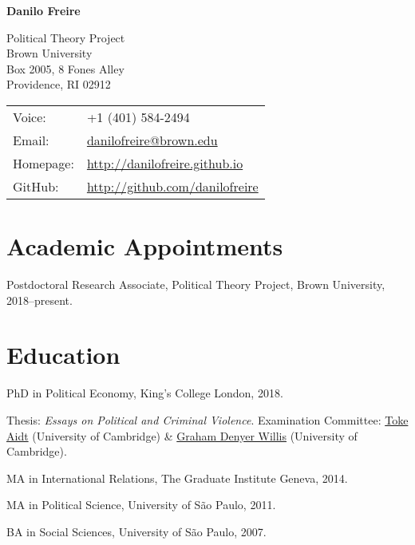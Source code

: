 \documentclass[a4paper]{article}
\def\name{Danilo Freire}
\renewenvironment{itemize}{
	\begin{list}{}{
			\setlength{\leftmargin}{1.5em}
		}
		}{
	\end{list}
}
\begin{document}
{\huge \bf \name}


\vspace{0.25in}

\begin{minipage}{0.45\linewidth}
	Political Theory Project \\
	Brown University \\
	Box 2005, 8 Fones Alley \\
	Providence, RI 02912 
\end{minipage}
\begin{minipage}{0.45\linewidth}
	\begin{tabular}{ll}
		Voice: & +1 (401) 584-2494 \\
		Email:          & \href{mailto:danilofreire@brown.edu}{danilofreire@brown.edu}          \\
		Homepage:       & \href{http://danilofreire.github.io/}{http://danilofreire.github.io}             \\
		GitHub:         & \href{http://github.com/danilofreire}{http://github.com/danilofreire}
	\end{tabular}
	\end{minipage}

	\section*{Academic Appointments}

	\begin{itemize}
		\item Postdoctoral Research Associate, Political Theory Project, Brown University, 2018--present.
	\end{itemize}

	\section*{Education}

	\begin{itemize}
		\item PhD in Political Economy, King's College London, 2018.
			\begin{itemize}
				\item Thesis: \textit{Essays on Political and Criminal Violence}. Examination Committee: \href{http://www.econ.cam.ac.uk/people/faculty/tsa23}{Toke Aidt} (University of Cambridge) \& \href{http://www.grahamdenyerwillis.com}{Graham Denyer Willis} (University of Cambridge).
			\end{itemize}
		\item MA in International Relations, The Graduate Institute Geneva, 2014.
		\item MA in Political Science, University of São Paulo, 2011.
		\item BA in Social Sciences, University of São Paulo, 2007.
	\end{itemize}
\end{document}
